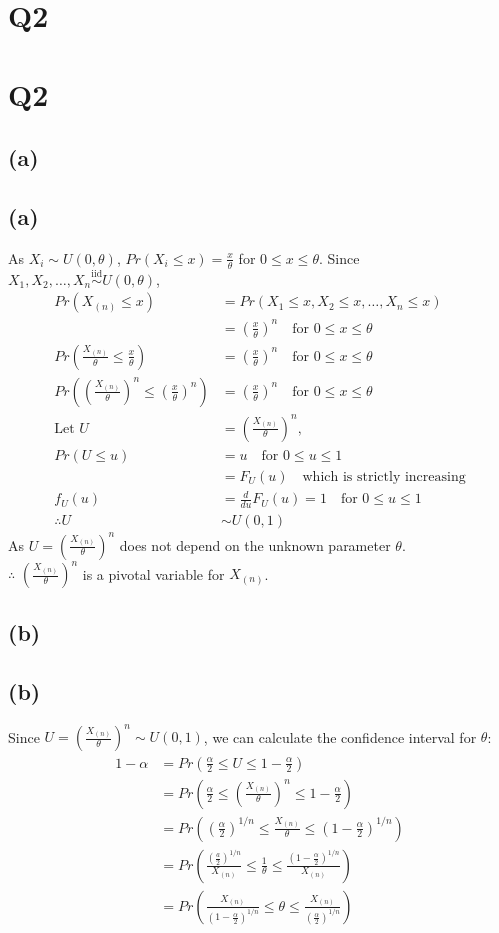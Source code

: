 \documentclass{article}
\newcommand{\mysectionstar}[2][]{%
    \ifthenelse{\equal{#1}{}}%
        {\section*{#2}}%
        {\section*[#1]{#2}}%
    \outline{1}{#2}%
}
\newcommand{\mysubsectionstar}[2][]{%
    \ifthenelse{\equal{#1}{}}%
        {\subsection*{#2}}%
        {\subsection*[#1]{#2}}%
    \outline{2}{#2}%
}
\begin{document}
\mysectionstar{Q2}

\mysubsectionstar{(a)}

As $X_i \sim U(0, \theta)$, $Pr(X_i \leq x) = \frac{x}{\theta}$ for $0 \leq x \leq \theta$. Since $X_1,X_2,\ldots,X_n \overset{\text{iid}}{\sim} U(0, \theta)$,
\begin{align*}
Pr(X_{(n)} \leq x) &= Pr(X_1 \leq x, X_2 \leq x, \ldots, X_n \leq x) \\
&= (\frac{x}{\theta})^n \quad \text{for } 0 \leq x \leq \theta \\
Pr(\frac{X_{(n)}}{\theta} \leq \frac{x}{\theta}) &= (\frac{x}{\theta})^n \quad \text{for } 0 \leq x \leq \theta \\
Pr((\frac{X_{(n)}}{\theta})^n \leq (\frac{x}{\theta})^n) &= (\frac{x}{\theta})^n \quad \text{for } 0 \leq x \leq \theta \\
\text{Let } U &= (\frac{X_{(n)}}{\theta})^n, \\
Pr(U \leq u) &= u \quad \text{for } 0 \leq u \leq 1 \\
&= F_U(u) \quad \text{which is strictly increasing} \\
f_U(u) &= \frac{d}{du} F_U(u) = 1 \quad \text{for } 0 \leq u \leq 1 \\
\therefore U &\sim U(0, 1)
\end{align*}
As $U = (\frac{X_{(n)}}{\theta})^n$ does not depend on the unknown parameter $\theta$. \\
$\therefore$ $(\frac{X_{(n)}}{\theta})^n$ is a pivotal variable for $X_{(n)}$.

\mysubsectionstar{(b)}

Since $U = (\frac{X_{(n)}}{\theta})^n \sim U(0, 1)$, we can calculate the confidence interval for $\theta$:
\begin{align*}
1 - \alpha &= Pr\left(\frac{\alpha}{2} \leq U \leq 1 - \frac{\alpha}{2}\right) \\
&= Pr\left(\frac{\alpha}{2} \leq (\frac{X_{(n)}}{\theta})^n \leq 1 - \frac{\alpha}{2}\right) \\
&= Pr\left((\frac{\alpha}{2})^{1/n} \leq \frac{X_{(n)}}{\theta} \leq (1 - \frac{\alpha}{2})^{1/n}\right) \\
&= Pr\left(\frac{(\frac{a}{2})^{1/n}}{X_{(n)}} \leq \frac{1}{\theta} \leq \frac{(1 - \frac{\alpha}{2})^{1/n}}{X_{(n)}}\right) \\
&= Pr\left(\frac{X_{(n)}}{(1 - \frac{\alpha}{2})^{1/n}} \leq \theta \leq \frac{X_{(n)}}{(\frac{\alpha}{2})^{1/n}}\right)
\end{align*}
\end{document}
